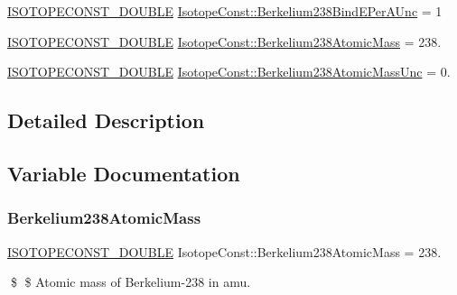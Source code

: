 \begin{DoxyCompactItemize}
\mbox{\hyperlink{group___isotope_const-_macros_ga8f45a7272ce02c0b4c65c44636ed719a}{I\+S\+O\+T\+O\+P\+E\+C\+O\+N\+S\+T\+\_\+\+D\+O\+U\+B\+LE}} \mbox{\hyperlink{group___isotope_const-_berkelium-_bk238_gae759674c70768ba2efe4918cda2df675}{Isotope\+Const\+::\+Berkelium238\+Bind\+E\+Per\+A\+Unc}} = 1
\item 
\mbox{\hyperlink{group___isotope_const-_macros_ga8f45a7272ce02c0b4c65c44636ed719a}{I\+S\+O\+T\+O\+P\+E\+C\+O\+N\+S\+T\+\_\+\+D\+O\+U\+B\+LE}} \mbox{\hyperlink{group___isotope_const-_berkelium-_bk238_ga8d47f69498df86bc961d1ffc55126736}{Isotope\+Const\+::\+Berkelium238\+Atomic\+Mass}} = 238.
\item 
\mbox{\hyperlink{group___isotope_const-_macros_ga8f45a7272ce02c0b4c65c44636ed719a}{I\+S\+O\+T\+O\+P\+E\+C\+O\+N\+S\+T\+\_\+\+D\+O\+U\+B\+LE}} \mbox{\hyperlink{group___isotope_const-_berkelium-_bk238_gae1a55f43709e68009541921807e661d7}{Isotope\+Const\+::\+Berkelium238\+Atomic\+Mass\+Unc}} = 0.
\end{DoxyCompactItemize}


\subsection{Detailed Description}


\subsection{Variable Documentation}
\mbox{\label{group___isotope_const-_berkelium-_bk238_ga8d47f69498df86bc961d1ffc55126736}} 
\subsubsection{\texorpdfstring{Berkelium238\+Atomic\+Mass}{Berkelium238AtomicMass}}
{\footnotesize\ttfamily \mbox{\hyperlink{group___isotope_const-_macros_ga8f45a7272ce02c0b4c65c44636ed719a}{I\+S\+O\+T\+O\+P\+E\+C\+O\+N\+S\+T\+\_\+\+D\+O\+U\+B\+LE}} Isotope\+Const\+::\+Berkelium238\+Atomic\+Mass = 238.}

\$ \$ Atomic mass of Berkelium-\/238 in amu. \mbox{\label{group___isotope_const-_berkelium-_bk238_gae1a55f43709e68009541921807e661d7}} 
